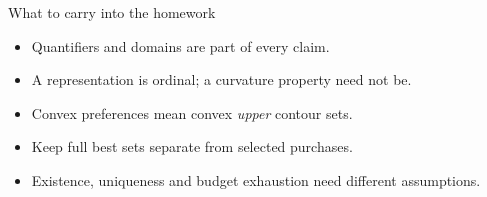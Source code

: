 \documentclass[aspectratio=169,10pt,handout]{beamer}
\begin{document}
\begin{frame}{What to carry into the homework}
\begin{itemize}
\item Quantifiers and domains are part of every claim.
\item A representation is ordinal; a curvature property need not be.
\item Convex preferences mean convex \emph{upper} contour sets.
\item Keep full best sets separate from selected purchases.
\item Existence, uniqueness and budget exhaustion need different assumptions.
\end{itemize}
\end{frame}
\end{document}
